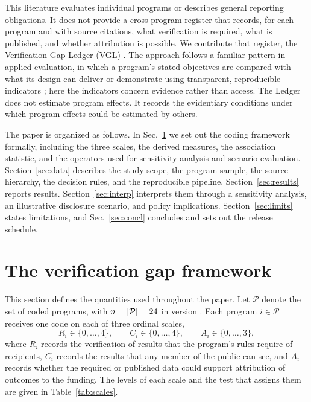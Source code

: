 \documentclass[10pt,twocolumn,letterpaper]{article}
\begin{document}
This literature evaluates individual programs or describes general reporting obligations. It does not provide a cross-program register that records, for each program and with source citations, what verification is required, what is published, and whether attribution is possible. We contribute that register, the Verification Gap Ledger (VGL) \cite{akindipe2026vgl}. The approach follows a familiar pattern in applied evaluation, in which a program's stated objectives are compared with what its design can deliver or demonstrate using transparent, reproducible indicators \cite{delmelle2012}; here the indicators concern evidence rather than access. The Ledger does not estimate program effects. It records the evidentiary conditions under which program effects could be estimated by others.

The paper is organized as follows. In Sec.~\ref{sec:framework} we set out the coding framework formally, including the three scales, the derived measures, the association statistic, and the operators used for sensitivity analysis and scenario evaluation. Section~\ref{sec:data} describes the study scope, the program sample, the source hierarchy, the decision rules, and the reproducible pipeline. Section~\ref{sec:results} reports results. Section~\ref{sec:interp} interprets them through a sensitivity analysis, an illustrative disclosure scenario, and policy implications. Section~\ref{sec:limits} states limitations, and Sec.~\ref{sec:concl} concludes and sets out the release schedule.

\section{The verification gap framework}\label{sec:framework}

This section defines the quantities used throughout the paper. Let $\mathcal{P}$ denote the set of coded programs, with $n = |\mathcal{P}| = 24$ in version \vglVersion. Each program $i \in \mathcal{P}$ receives one code on each of three ordinal scales,
\begin{equation}
R_i \in \{0,\dots,4\}, \qquad C_i \in \{0,\dots,4\}, \qquad A_i \in \{0,\dots,3\},
\label{eq:scales}
\end{equation}
where $R_i$ records the verification of results that the program's rules require of recipients, $C_i$ records the results that any member of the public can see, and $A_i$ records whether the required or published data could support attribution of outcomes to the funding. The levels of each scale and the test that assigns them are given in Table~\ref{tab:scales}.
\end{document}
